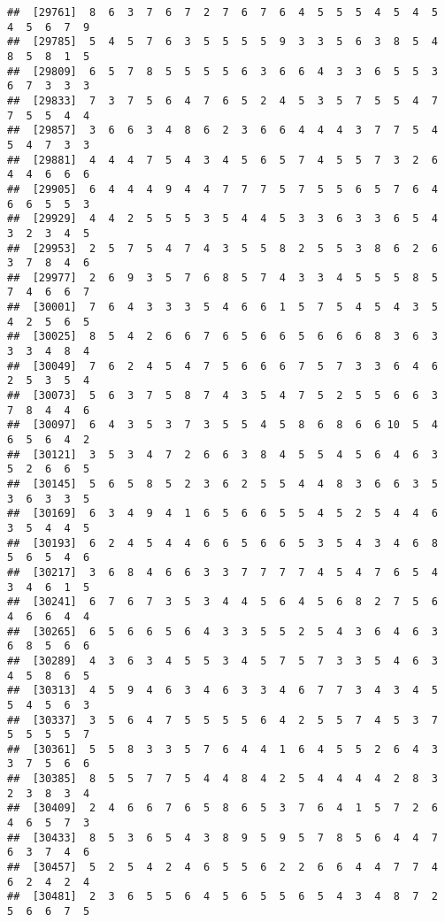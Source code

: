 \documentclass[
]{book}
\begin{document}
\begin{verbatim}
##  [29761]  8  6  3  7  6  7  2  7  6  7  6  4  5  5  5  4  5  4  5  4  5  6  7  9
##  [29785]  5  4  5  7  6  3  5  5  5  5  9  3  3  5  6  3  8  5  4  8  5  8  1  5
##  [29809]  6  5  7  8  5  5  5  5  6  3  6  6  4  3  3  6  5  5  3  6  7  3  3  3
##  [29833]  7  3  7  5  6  4  7  6  5  2  4  5  3  5  7  5  5  4  7  7  5  5  4  4
##  [29857]  3  6  6  3  4  8  6  2  3  6  6  4  4  4  3  7  7  5  4  5  4  7  3  3
##  [29881]  4  4  4  7  5  4  3  4  5  6  5  7  4  5  5  7  3  2  6  4  4  6  6  6
##  [29905]  6  4  4  4  9  4  4  7  7  7  5  7  5  5  6  5  7  6  4  6  6  5  5  3
##  [29929]  4  4  2  5  5  5  3  5  4  4  5  3  3  6  3  3  6  5  4  3  2  3  4  5
##  [29953]  2  5  7  5  4  7  4  3  5  5  8  2  5  5  3  8  6  2  6  3  7  8  4  6
##  [29977]  2  6  9  3  5  7  6  8  5  7  4  3  3  4  5  5  5  8  5  7  4  6  6  7
##  [30001]  7  6  4  3  3  3  5  4  6  6  1  5  7  5  4  5  4  3  5  4  2  5  6  5
##  [30025]  8  5  4  2  6  6  7  6  5  6  6  5  6  6  6  8  3  6  3  3  3  4  8  4
##  [30049]  7  6  2  4  5  4  7  5  6  6  6  7  5  7  3  3  6  4  6  2  5  3  5  4
##  [30073]  5  6  3  7  5  8  7  4  3  5  4  7  5  2  5  5  6  6  3  7  8  4  4  6
##  [30097]  6  4  3  5  3  7  3  5  5  4  5  8  6  8  6  6 10  5  4  6  5  6  4  2
##  [30121]  3  5  3  4  7  2  6  6  3  8  4  5  5  4  5  6  4  6  3  5  2  6  6  5
##  [30145]  5  6  5  8  5  2  3  6  2  5  5  4  4  8  3  6  6  3  5  3  6  3  3  5
##  [30169]  6  3  4  9  4  1  6  5  6  6  5  5  4  5  2  5  4  4  6  3  5  4  4  5
##  [30193]  6  2  4  5  4  4  6  6  5  6  6  5  3  5  4  3  4  6  8  5  6  5  4  6
##  [30217]  3  6  8  4  6  6  3  3  7  7  7  7  4  5  4  7  6  5  4  3  4  6  1  5
##  [30241]  6  7  6  7  3  5  3  4  4  5  6  4  5  6  8  2  7  5  6  4  6  6  4  4
##  [30265]  6  5  6  6  5  6  4  3  3  5  5  2  5  4  3  6  4  6  3  6  8  5  6  6
##  [30289]  4  3  6  3  4  5  5  3  4  5  7  5  7  3  3  5  4  6  3  4  5  8  6  5
##  [30313]  4  5  9  4  6  3  4  6  3  3  4  6  7  7  3  4  3  4  5  5  4  5  6  3
##  [30337]  3  5  6  4  7  5  5  5  5  6  4  2  5  5  7  4  5  3  7  5  5  5  5  7
##  [30361]  5  5  8  3  3  5  7  6  4  4  1  6  4  5  5  2  6  4  3  3  7  5  6  6
##  [30385]  8  5  5  7  7  5  4  4  8  4  2  5  4  4  4  4  2  8  3  2  3  8  3  4
##  [30409]  2  4  6  6  7  6  5  8  6  5  3  7  6  4  1  5  7  2  6  4  6  5  7  3
##  [30433]  8  5  3  6  5  4  3  8  9  5  9  5  7  8  5  6  4  4  7  6  3  7  4  6
##  [30457]  5  2  5  4  2  4  6  5  5  6  2  2  6  6  4  4  7  7  4  6  2  4  2  4
##  [30481]  2  3  6  5  5  6  4  5  6  5  5  6  5  4  3  4  8  7  2  5  6  6  7  5

\end{verbatim}
\end{document}
